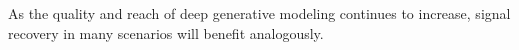\documentclass[11pt]{article}
\newcommand{\red}[1]{{\color{black} #1}}
\begin{document}
As the quality and reach of deep generative modeling continues to increase, signal recovery in many scenarios will benefit analogously. 




\end{document}
